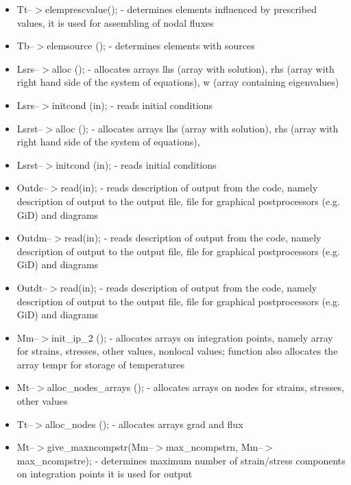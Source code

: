 \begin{itemize}
\item
Tt--$>$elemprescvalue(); - determines elements influenced by prescribed
values, it is used for assembling of nodal fluxes

\item
Tb--$>$elemsource (); - determines elements with sources


\item
Lsrs--$>$alloc (); - allocates arrays lhs (array with solution),
rhs (array with right hand side of the system of equations),
w (array containing eigenvalues)
 
\item
Lsrs--$>$initcond (in); - reads initial conditions

\item
Lsrst--$>$alloc (); - allocates arrays lhs (array with solution),
rhs (array with right hand side of the system of equations),

\item
Lsrst--$>$initcond (in); - reads initial conditions

\item
Outdc--$>$read(in); - reads description of output from the code, namely description
of output to the output file, file for graphical postprocessors (e.g. GiD) and
diagrams

\item
Outdm--$>$read(in); - reads description of output from the code, namely description
of output to the output file, file for graphical postprocessors (e.g. GiD) and
diagrams

\item
Outdt--$>$read(in); - reads description of output from the code, namely description
of output to the output file, file for graphical postprocessors (e.g. GiD) and
diagrams

\item
Mm--$>$init\_ip\_2 (); - allocates arrays on integration points, namely array
for strains, stresses, other values, nonlocal values;
function also allocates the array tempr for storage of temperatures

\item
Mt--$>$alloc\_nodes\_arrays (); - allocates arrays on nodes for
strains, stresses, other values

\item
Tt--$>$alloc\_nodes (); - allocates arrays grad and flux

\item
Mt--$>$give\_maxncompstr(Mm--$>$max\_ncompstrn, Mm--$>$max\_ncompstre); - determines
maximum number of strain/stress components on integration points
it is used for output


\end{itemize}

